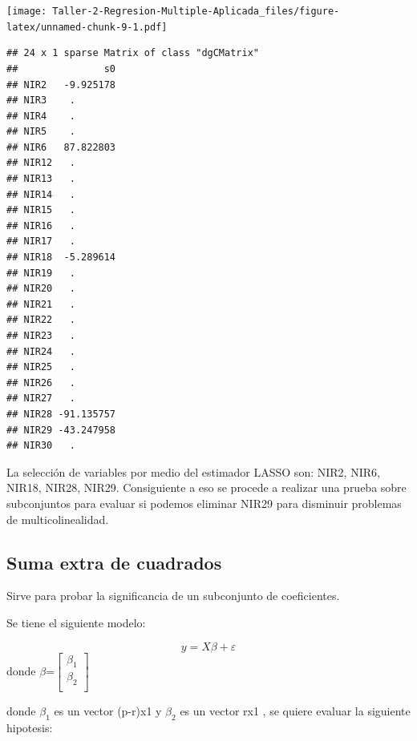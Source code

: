 \documentclass[
]{article}
\newenvironment{Shaded}{\begin{snugshade}}{\end{snugshade}}
\newcommand{\AttributeTok}[1]{\textcolor[rgb]{0.77,0.63,0.00}{#1}}
\newcommand{\DecValTok}[1]{\textcolor[rgb]{0.00,0.00,0.81}{#1}}
\newcommand{\FloatTok}[1]{\textcolor[rgb]{0.00,0.00,0.81}{#1}}
\newcommand{\FunctionTok}[1]{\textcolor[rgb]{0.00,0.00,0.00}{#1}}
\newcommand{\NormalTok}[1]{#1}
\newcommand{\OtherTok}[1]{\textcolor[rgb]{0.56,0.35,0.01}{#1}}
\newcommand{\SpecialCharTok}[1]{\textcolor[rgb]{0.00,0.00,0.00}{#1}}
\begin{document}
\texttt{[image: Taller-2-Regresion-Multiple-Aplicada\_files/figure-latex/unnamed-chunk-9-1.pdf]}

\begin{Shaded}
\end{Shaded}

\begin{verbatim}
## 24 x 1 sparse Matrix of class "dgCMatrix"
##               s0
## NIR2   -9.925178
## NIR3    .       
## NIR4    .       
## NIR5    .       
## NIR6   87.822803
## NIR12   .       
## NIR13   .       
## NIR14   .       
## NIR15   .       
## NIR16   .       
## NIR17   .       
## NIR18  -5.289614
## NIR19   .       
## NIR20   .       
## NIR21   .       
## NIR22   .       
## NIR23   .       
## NIR24   .       
## NIR25   .       
## NIR26   .       
## NIR27   .       
## NIR28 -91.135757
## NIR29 -43.247958
## NIR30   .
\end{verbatim}

La selección de variables por medio del estimador LASSO son: NIR2, NIR6,
NIR18, NIR28, NIR29. Consiguiente a eso se procede a realizar una prueba
sobre subconjuntos para evaluar si podemos eliminar NIR29 para disminuir
problemas de multicolinealidad.

\hypertarget{suma-extra-de-cuadrados}{%
\subsection{Suma extra de cuadrados}\label{suma-extra-de-cuadrados}}

Sirve para probar la significancia de un subconjunto de coeficientes.

Se tiene el siguiente modelo:

\[y = X\beta+\varepsilon\] donde
\(\beta\)=\(\begin{bmatrix} \beta_{1}\\ \beta_{2} \\ \end{bmatrix}\)

donde \(\beta_1\) es un vector (p-r)x1 y \(\beta_2\) es un vector rx1 ,
se quiere evaluar la siguiente hipotesis:
\end{document}
